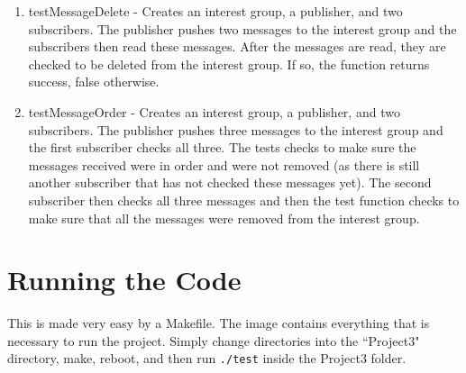 \documentclass{article}
\begin{document}
\begin{enumerate}
	\item testMessageDelete - Creates an interest group, a publisher, and two subscribers.  The publisher pushes two messages to the interest group and the subscribers then read these messages.  After the messages are read, they are checked to be deleted from the interest group.  If so, the function returns success, false otherwise.
	\item testMessageOrder - Creates an interest group, a publisher, and two subscribers.  The publisher pushes three messages to the interest group and the first subscriber checks all three.  The tests checks to make sure the messages received were in order and were not removed (as there is still another subscriber that has not checked these messages yet).  The second subscriber then checks all three messages and then the test function checks to make sure that all the messages were removed from the interest group.
\end{enumerate}

\section{Running the Code}

This is made very easy by a Makefile.  The image contains everything that is necessary to run the project.  Simply change directories into the ``Project3" directory, make, reboot, and then run \verb+./test+ inside the Project3 folder.
\end{document}

